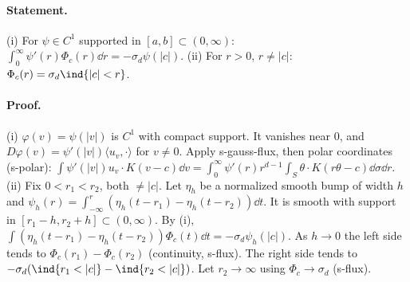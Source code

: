 \paragraph{Statement.} (i) For $\psi\in C^1$ supported in $[a,b]\subset(0,\infty)$:
$\int_0^\infty\psi'(r)\Phi_c(r)\dd r=-\sigma_d\psi(|c|)$. (ii) For $r>0$, $r\neq|c|$: $\Phi_c(r)=\sigma_d\ind\{|c|<r\}$.
\paragraph{Proof.} (i) $\varphi(v)=\psi(|v|)$ is $C^1$ with compact support. It vanishes near $0$, and
$D\varphi(v)=\psi'(|v|)\langle u_v,\cdot\rangle$ for $v\neq0$. Apply s-gauss-flux, then polar coordinates (s-polar):
$\int\psi'(|v|)u_v\cdot K(v-c)\dd v=\int_0^\infty\psi'(r)r^{d-1}\int_S\theta\cdot K(r\theta-c)\dd\sigma\dd r$.
(ii) Fix $0<r_1<r_2$, both $\neq|c|$. Let $\eta_h$ be a normalized smooth bump of width $h$ and
$\psi_h(r)=\int_{-\infty}^r(\eta_h(t-r_1)-\eta_h(t-r_2))\dd t$. It is smooth with support in
$[r_1-h,r_2+h]\subset(0,\infty)$. By (i), $\int(\eta_h(t-r_1)-\eta_h(t-r_2))\Phi_c(t)\dd t=-\sigma_d\psi_h(|c|)$. As $h\to0$
the left side tends to $\Phi_c(r_1)-\Phi_c(r_2)$ (continuity, s-flux). The right side tends to
$-\sigma_d(\ind\{r_1<|c|\}-\ind\{r_2<|c|\})$. Let $r_2\to\infty$ using $\Phi_c\to\sigma_d$ (s-flux).
